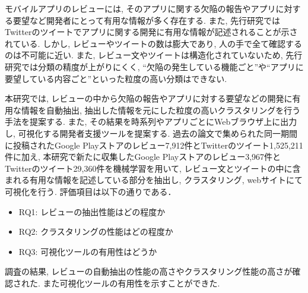 
モバイルアプリのレビューには, そのアプリに関する欠陥の報告やアプリに対する要望など開発者にとって有用な情報が多く存在する. また, 先行研究ではTwitterのツイートでアプリに関する開発に有用な情報が記述されることが示されている. しかし, レビューやツイートの数は膨大であり, 人の手で全て確認するのは不可能に近い. 
また, レビュー文やツイートは構造化されていないため, 先行研究では分類の精度が上がりにくく, ``欠陥の発生している機能ごと''や``アプリに要望している内容ごと''といった粒度の高い分類はできない. 

本研究では, レビューの中から欠陥の報告やアプリに対する要望などの開発に有用な情報を自動抽出, 抽出した情報を元にした粒度の高いクラスタリングを行う手法を提案する. また, その結果を時系列やアプリごとにWebブラウザ上に出力し, 可視化する開発者支援ツールを提案する.
過去の論文で集められた同一期間に投稿されたGoogle Playストアのレビュー7,912件とTwitterのツイート1,525,211件に加え, 本研究で新たに収集したGoogle Playストアのレビュー3,967件とTwitterのツイート29,360件を機械学習を用いて, レビュー文とツイートの中に含まれる有用な情報を記述している部分を抽出し, クラスタリング, webサイトにて可視化を行う. 評価項目は以下の通りである．
\begin{itemize}
    \item RQ1: レビューの抽出性能はどの程度か
    \item RQ2: クラスタリングの性能はどの程度か
    \item RQ3: 可視化ツールの有用性はどうか
\end{itemize}

調査の結果, レビューの自動抽出の性能の高さやクラスタリング性能の高さが確認された. また可視化ツールの有用性を示すことができた. 
